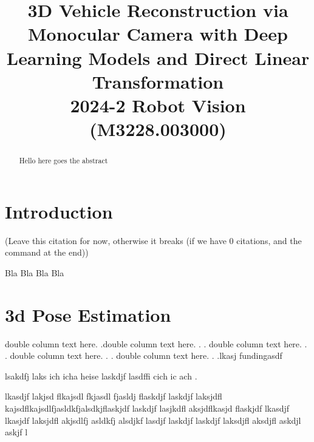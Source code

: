 \documentclass[conference]{IEEEtran}
\begin{document}
\title{3D Vehicle Reconstruction via Monocular Camera with Deep Learning Models and Direct Linear Transformation\\
{\footnotesize 2024-2 Robot Vision (M3228.003000)}
}

\author{
    \and
    \and
}

\maketitle

\begin{abstract}
    Hello here goes the abstract
\end{abstract}

\section{Introduction}
\begin{center}
    \cite{main-article}
    (Leave this citation for now, otherwise it breaks (if we have 0 citations, and the command at the end))
\end{center}

Bla Bla Bla Bla

\section{3d Pose Estimation}
\setcounter{MaxMatrixCols}{20}


\begin{multicols}{2}

    double column text here. .double column text here. . .
    double column text here. . .
    double column text here. . .
    double column text here. . .lkasj fundingasdf

    lsakdfj laks ich icha heise laskdjf lasdffi cich ic ach 
    .

\end{multicols}
 lkasdjf lakjsd flkajsdl fkjasdl fjasldj flaskdjf laskdjf laksjdfl kajsdflkajsdlfjasldkfjalsdkjflaskjdf laskdjf lasjkdfl aksjdflkasjd flaskjdf lkasdjf lkasjdf laksjdfl akjsdlfj asldkfj alsdjkf lasdjf laskdjf laskdjf laksdjfl aksdjfl askdjl askjf l
\end{document}
